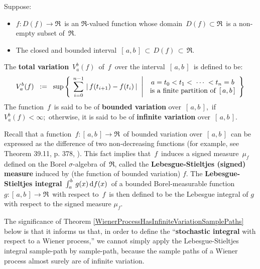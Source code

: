 
\vskip 1.0cm
\begin{definition}
\mbox{}
\vskip 0.1cm
\noindent
Suppose:
\begin{itemize}
\item
	$f : D(f) \longrightarrow \Re$\, is an $\Re$-valued function
	whose domain \,$D(f) \subset \Re$\, is a non-empty subset of \,$\Re$.
\item
	The closed and bounded interval \,$[\,a,b\,] \,\subset\, D(f) \,\subset\, \Re$.
\end{itemize}
\vskip 0.1cm
\noindent
The \textbf{total variation} \,$V^{b}_{a}(f)$\, of \,$f$\,
over the interval \,$[\,a,b\,]$\, is defined to be:
\begin{equation*}
V^{b}_{a}(f)
\;\; := \;\;
	\sup
	\left\{\;
		\left.
		\overset{n-1}{\underset{i=0}{\sum}}\,
		\left\vert\,f\!\left(t_{i+1}\right)-f\!\left(t_{i}\right)\,\right\vert
		\;\;\right\vert\;
		\begin{array}{c}
			a = t_{0} < t_{1} < \;\cdots\; < t_{n} = b
			\\
			\textnormal{is a finite partition of \,$[\,a,b\,]$}
			\end{array}
		\right\}
\end{equation*}
The function \,$f$\, is said to be of \textbf{bounded variation} over \,$[\,a,b\,]$,\,
if \,$V^{b}_{a}(f) < \infty$;\,
otherwise, it is said to be of \textbf{infinite variation} over \,$[\,a,b\,]$.
\end{definition}


\vskip 0.5cm
\begin{remark}
\mbox{}
\vskip 0.1cm
\noindent
Recall that a function \,$f : [\,a,b\,] \longrightarrow \Re$\, of bounded variation over \,$[\,a,b\,]$\, 
can be expressed as the difference of two non-decreasing functions
(for example, see Theorem 39.11, p. 378, \cite{Aliprantis1998}).
This fact implies that \,$f$\, induces a signed measure \,$\mu_{f}$
defined on the Borel $\sigma$-algebra of \,$\Re$,
called the \textbf{Lebesgue-Stieltjes (signed) measure}
induced by (the function of bounded variation) $f$.
The \textbf{Lebesgue-Stieltjes integral}
\,$\int_{a}^{b}\,g(x)\,\textnormal{d} f(x)$\,
of a bounded Borel-measurable function \,$g : [\,a,b\,] \longrightarrow \Re$\, with respect to \,$f$\,
is then defined to be the Lebesgue integral of $g$ with respect to the signed measure $\mu_{f}$.

The significance of Theorem \ref{WienerProcessHasInfiniteVariationSamplePaths} below is that
it informs us that, in order to define the ``\textbf{stochastic integral} with respect to a Wiener process,''
we cannot simply apply the Lebesgue-Stieltjes integral sample-path by sample-path,
because the sample paths of a Wiener process almost surely are of infinite variation.
\end{remark}

